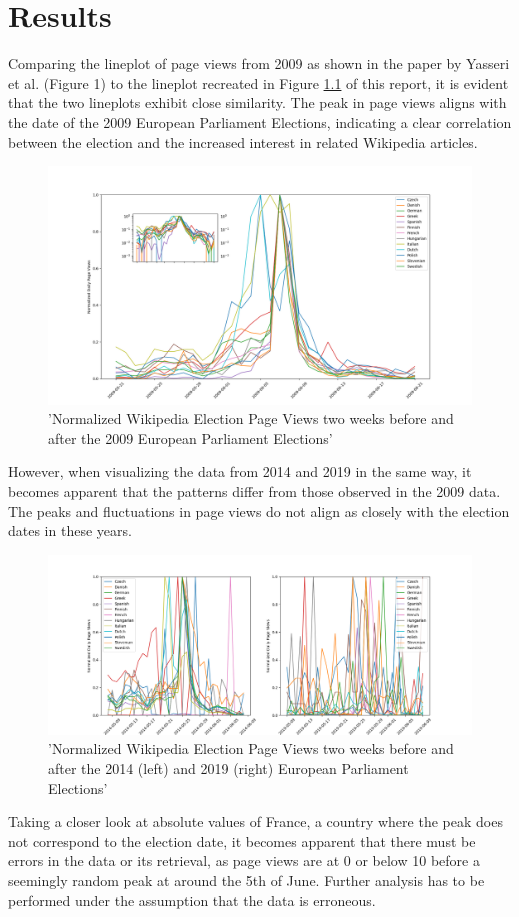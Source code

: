 \chapter{Results}
\label{sec:results}

Comparing the lineplot of page views from 2009 as shown in the paper by Yasseri et al. (Figure 1) to the lineplot recreated in Figure \ref{fig:figure1} of this report, it is evident that the two lineplots exhibit close similarity. The peak in page views aligns with the date of the 2009 European Parliament Elections, indicating a clear correlation between the election and the increased interest in related Wikipedia articles. 

\begin{figure}[t!]
    \centering
    \includegraphics[width=\textwidth]{fig/lineplot_2009.png}
    \caption{'Normalized Wikipedia Election Page Views two weeks before and after the 2009 European Parliament Elections'}
    \label{fig:figure1}
\end{figure} 
However, when visualizing the data from 2014 and 2019 in the same way, it becomes apparent that the patterns differ from those observed in the 2009 data. The peaks and fluctuations in page views do not align as closely with the election dates in these years. 
\begin{figure}[t!]
    \centering
    \includegraphics[width=\textwidth]{fig/lineplot_2014_2019.png}
    \caption{'Normalized Wikipedia Election Page Views two weeks before and after the 2014 (left) and 2019 (right) European Parliament Elections'}
    \label{fig:figure2}
\end{figure}
Taking a closer look at absolute values of France, a country  where the peak does not correspond to the election date, it becomes apparent that there must be errors in the data or its retrieval, as page views are at 0 or below 10 before a seemingly random peak at around the 5th of June. Further analysis has to be performed under the assumption that the data is erroneous.
